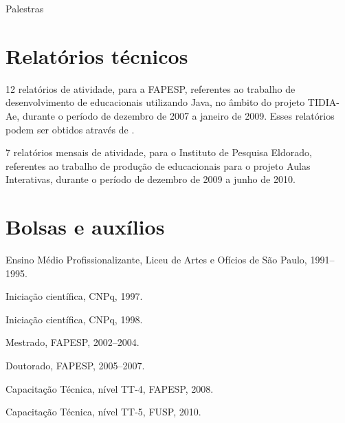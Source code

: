 \begin{compactitem}
	\item Palestras
	\begin{compactitem}
		
	\end{compactitem}
\end{compactitem}

\section*{Relatórios técnicos}

\begin{compactitem}
	\item 12 relatórios de atividade, para a FAPESP, referentes ao trabalho de desenvolvimento de  educacionais utilizando Java, no âmbito do projeto TIDIA-Ae, durante o período de dezembro de 2007 a janeiro de 2009. Esses relatórios podem ser obtidos através de \cite{irpagnossin-stoa}.
	\item 7 relatórios mensais de atividade, para o Instituto de Pesquisa Eldorado, referentes ao trabalho de produção de  educacionais para o projeto Aulas Interativas, durante o período de dezembro de 2009 a junho de 2010.
\end{compactitem}

\section*{Bolsas e auxílios}

\begin{compactitem}
	\item Ensino Médio Profissionalizante, Liceu de Artes e Ofícios de São Paulo, 1991--1995.
	\item Iniciação científica, CNPq, 1997.
	\item Iniciação científica, CNPq, 1998.
	\item Mestrado, FAPESP, 2002--2004.
	\item Doutorado, FAPESP, 2005--2007.
	\item Capacitação Técnica, nível TT-4, FAPESP, 2008.
	\item Capacitação Técnica, nível TT-5, FUSP, 2010.
\end{compactitem}

